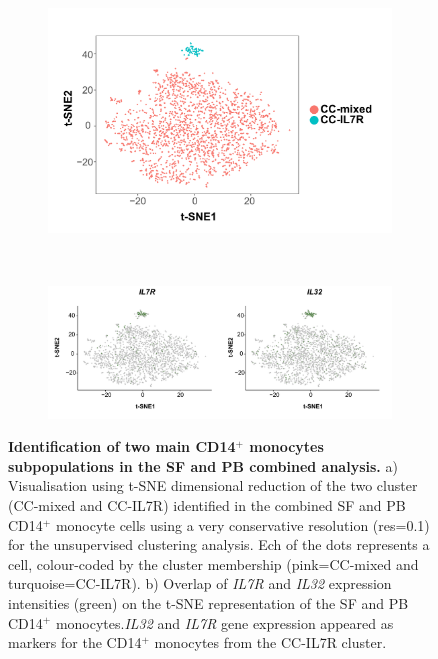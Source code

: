 \bigskip
\begin{figure}[H]
\centering
\begin{subfigure}[b]{0.60\textwidth}
\centering 
\includegraphics[width=\textwidth]{./Results3/pdfs/PSA_scRNAseq_tSNE_CC_mixed_and_IL7R}
\caption{}
\end{subfigure}
~
\begin{subfigure}[b]{0.75\textwidth} 
\centering
\includegraphics[width=\textwidth]{./Results3/pdfs/PSA_scRNAseq_CC_mixed_and_IL7R_overlay_markers}
\caption{}
\end{subfigure}
\caption[Identification of two main CD14$^+$ monocytes subpopulations in the SF and PB combined analysis]{\textbf{Identification of two main CD14$^+$ monocytes subpopulations in the SF and PB combined analysis.} a) Visualisation using t-SNE dimensional reduction of the two cluster (CC-mixed and CC-IL7R) identified in the combined SF and PB CD14$^+$ monocyte cells using a very conservative resolution (res=0.1) for the unsupervised clustering analysis. Ech of the dots represents a cell, colour-coded by the cluster membership (pink=CC-mixed and turquoise=CC-IL7R). b) Overlap of \textit{IL7R} and \textit{IL32} expression intensities (green) on the t-SNE representation of the SF and PB CD14$^+$ monocytes.\textit{IL32} and \textit{IL7R} gene expression appeared as markers for the CD14$^+$ monocytes from the CC-IL7R cluster.}
\label{figure:PsA_scRNAseq_SF_an_PB_monocytes_identification_from_bulk}
\end{figure}

